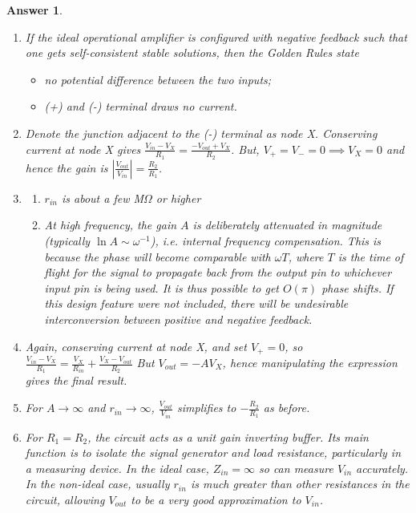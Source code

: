 \documentclass[a4paper]{article}
\newtheorem{ans}{Answer}[subsection]
\theoremstyle{new}
\begin{document}
\newpage
\begin{ans}\leavevmode
\begin{enumerate}[label=(\roman*)]
\item If the ideal operational amplifier is configured with negative feedback such that one gets self-consistent stable solutions, then the Golden Rules state
\begin{itemize}
    \item no potential difference between the two inputs;
    \item (+) and (-) terminal draws no current.
\end{itemize}
\item Denote the junction adjacent to the (-) terminal as node X. Conserving current at node X gives
$\frac{V_{in}-V_X}{R_1}=\frac{-V_{out}+V_X}{R_2}$. But, 
$V_+=V_-=0\implies V_X=0$ and hence the gain is $|\frac{V_{out}}{V_{in}}|=\frac{R_2}{R_1}$.
\item
\begin{enumerate}[label=(\alph*)]
\item 
$r_{in}$ is about a few M$\Omega$ or higher
\item At high frequency, the gain $A$ is deliberately attenuated in magnitude (typically $\ln A\sim\omega^{-1}$), i.e. internal frequency compensation. This is because the phase will become comparable with $\omega T$, where $T$ is the time of flight for the signal to propagate back from the output pin to whichever input pin is being used. It is thus possible to get $O(\pi)$ phase shifts. If this design feature were not included, there will be undesirable interconversion between positive and negative feedback.
\end{enumerate}
\item Again, conserving current at node X, and set $V_+=0$, so
$\frac{V_{in}-V_X}{R_1}=\frac{V_X}{R_{in}}+\frac{V_X-V_{out}}{R_2}$
But $V_{out}=-AV_X$, hence manipulating the expression gives the final result.
\item For $A\rightarrow\infty$ and $r_{in}\rightarrow\infty$, $\frac{V_{out}}{V_{in}}$ simplifies to $-\frac{R_2}{R_1}$ as before.
\item For $R_1=R_2$, the circuit acts as a unit gain inverting buffer. Its main function is to isolate the signal generator and load resistance, particularly in a measuring device. In the ideal case, $Z_{in}=\infty$ so can measure $V_{in}$ accurately. In the non-ideal case, usually $r_{in}$ is much greater than other resistances in the circuit, allowing $V_{out}$ to be a very good approximation to $V_{in}$.
\end{enumerate}
\end{ans}
\newpage
\end{document}
